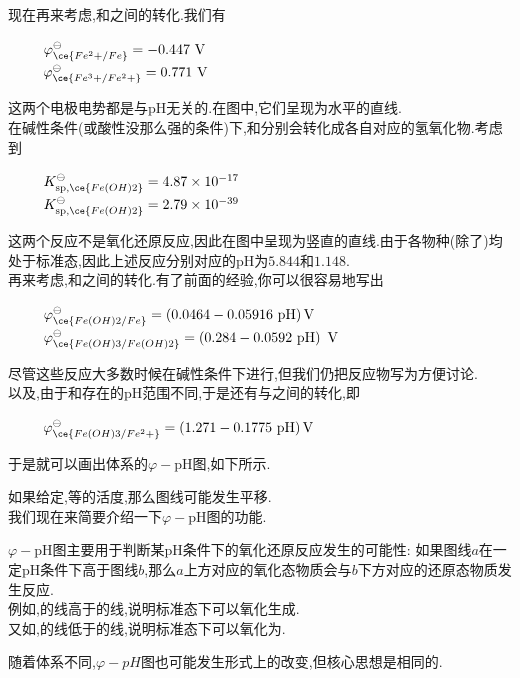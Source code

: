 \documentclass{ctexart}
\begin{document}
\indent 现在再来考虑,和之间的转化.我们有
\begin{tightcenter}
    \ \ \ \ \ $\varphi_{\ce{Fe^2+/Fe}}^\ominus=-0.447\text{ V}$\\
    \ \ \ \ \ $\varphi_{\ce{Fe^3+/Fe^2+}}^\ominus=0.771\text{ V}$
\end{tightcenter}
这两个电极电势都是与pH无关的.在图中,它们呈现为水平的直线.\\
\indent 在碱性条件(或酸性没那么强的条件)下,和分别会转化成各自对应的氢氧化物.考虑到
\begin{tightcenter}
    \ \ \ \ \ $K_{\text{sp},\ce{Fe(OH)2}}^\ominus=4.87\times10^{-17}$\\
    \ \ \ \ \ $K_{\text{sp},\ce{Fe(OH)2}}^\ominus=2.79\times10^{-39}$
\end{tightcenter}
这两个反应不是氧化还原反应,因此在图中呈现为竖直的直线.由于各物种(除了)均处于标准态,因此上述反应分别对应的pH为$5.844$和$1.148$.\\
\indent 再来考虑,和之间的转化.有了前面的经验,你可以很容易地写出
\begin{tightcenter}
    \ \ \ \ \ $\varphi_{\ce{Fe(OH)2/Fe}}^\ominus=\left(0.0464-0.05916\text{ pH}\right)\text{V}$\\
    \ \ \ \ \ $\varphi_{\ce{Fe(OH)3/Fe(OH)2}}^\ominus=\left(0.284-0.0592\text{ pH}\right)\text{ V}$
\end{tightcenter}
尽管这些反应大多数时候在碱性条件下进行,但我们仍把反应物写为方便讨论.\\
以及,由于和存在的pH范围不同,于是还有与之间的转化,即
\begin{tightcenter}
    \ \ \ \ \ $\varphi_{\ce{Fe(OH)3/Fe^2+}}^\ominus=\left(1.271-0.1775\text{ pH}\right)\text{V}$\\
\end{tightcenter}
于是就可以画出体系的$\varphi-\text{pH}$图,如下所示.
\begin{figure}[H]
    \centering
\end{figure}
如果给定,等的活度,那么图线可能发生平移.\\
\indent 我们现在来简要介绍一下$\varphi-\text{pH}$图的功能.
\begin{theorem}
    $\varphi-\text{pH}$图主要用于判断某pH条件下的氧化还原反应发生的可能性:%
    如果图线$a$在一定pH条件下高于图线$b$,那么$a$上方对应的氧化态物质会与$b$下方对应的还原态物质发生反应.\\
    例如,的线高于的线,说明标准态下可以氧化生成.\\
    又如,的线低于的线,说明标准态下可以氧化为.
\end{theorem}
随着体系不同,$\varphi-pH$图也可能发生形式上的改变,但核心思想是相同的.
\end{document}

